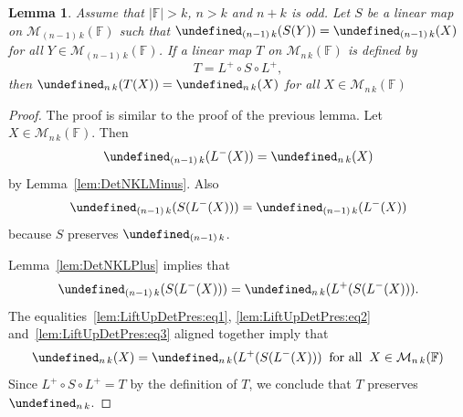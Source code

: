\documentclass{elsarticle}
\def\F{{\mathbb F}}
\def\M{{\mathcal M}}
\let\det\undefined
\DeclareMathOperator{\det}{det}
\theoremstyle{plain}
\newtheorem{lemma}[theorem]{Lemma}
\theoremstyle{definition}
\numberwithin{equation}{section}
\begin{document}
\begin{lemma}\label{lem:LiftUpDetPres}Assume that  $|\F| > k$, $n > k$ and $n + k$ is odd. Let $S$ be a linear map on $\M_{(n-1)\, k} (\F)$ such that $\det_{(n-1)\, k} (S(Y)) = \det_{(n-1)\,k}(X)$ for all $Y \in \M_{(n-1)\,k}(\F)$. If a linear map $T$ on $\M_{n\,k}(\F)$ is defined by $$T = L^{+} \circ S \circ L^{+},$$ then $\det_{n\, k} (T(X)) = \det_{n\,k}(X)$ for all $X \in \M_{n\,k}(\F)$
\end{lemma}
\begin{proof}The proof is similar to the proof of the previous lemma. Let $X \in \M_{n\,k}(\F)$. Then
\begin{equation}\label{lem:LiftUpDetPres:eq1}
\det_{(n-1)\,k}(L^{-}(X)) = \det_{n\,k}(X)
\end{equation}
 by Lemma~\ref{lem:DetNKLMinus}. Also %
\begin{equation}\label{lem:LiftUpDetPres:eq2}
\det_{(n-1)\,k}(S(L^{-}(X))) = \det_{(n-1)\,k}(L^{-}(X))
\end{equation}
because $S$ preserves $\det_{(n-1)\,k}$.

Lemma~\ref{lem:DetNKLPlus} implies that
\begin{equation}\label{lem:LiftUpDetPres:eq3}
\det_{(n-1)\,k}(S(L^{-}(X))) = \det_{n\,k}(L^{+}(S(L^{-}(X))).
\end{equation} The equalities~\eqref{lem:LiftUpDetPres:eq1}, \eqref{lem:LiftUpDetPres:eq2} and~\eqref{lem:LiftUpDetPres:eq3} aligned together imply that
\[
\det_{n\,k}(X) = \det_{n\,k}(L^{+}(S(L^{-}(X)))\;\;\mbox{for all}\;\; X \in \M_{n\,k}(\F)
\]
Since $ L^{+} \circ S \circ L^{+} = T$ by the definition of $T$, we conclude that $T$ preserves $\det_{n\,k}$.
\end{proof}
\end{document}
